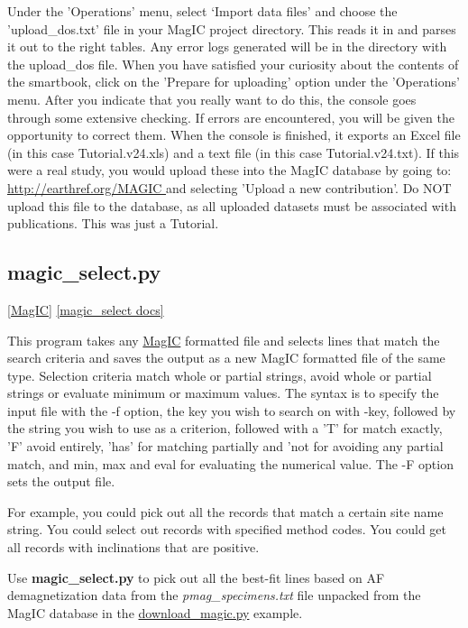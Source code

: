 \documentclass[11pt]{book}
\begin{document}
{{{  Under the 'Operations' menu, select `Import data files' and choose the 'upload\_dos.txt' file in your MagIC project directory.  
 This reads it in and parses it out to the right tables.  Any error logs generated will be in the directory with the upload\_dos file.  When you have satisfied your curiosity about the contents of the smartbook, click on the 'Prepare for uploading' option under the 'Operations' menu.  After you indicate that you really want to do this, the console goes through some extensive checking.   If errors are encountered, you will be given the opportunity to correct them.  When the console  is finished,  it exports an Excel file (in this case Tutorial.v24.xls) and a text file (in this case Tutorial.v24.txt).  If this were a real study, you would upload these into the MagIC database by going to:
\url{  http://earthref.org/MAGIC }
  and selecting 'Upload a new contribution'.  
  Do NOT upload this file to the database, as all uploaded datasets must be associated with publications.  This was just a Tutorial.
  

%


%
\subsection{magic\_select.py}
\href{#MagIC}{[MagIC]}
\href{http://earthref.org/PmagPy/pmagpydocs/magic_select-module.html}{[magic\_select docs]}


This program takes any \href{#MagIC}{MagIC} formatted file and selects lines that match the search criteria and saves the output as a new MagIC formatted file of the same type.  Selection criteria match whole or partial strings, avoid whole or partial strings or evaluate minimum or maximum values.    The syntax is to specify the input file with the -f option, the key you wish to search on with -key, followed by the string you wish to use as a criterion, followed with a 'T' for match exactly, 'F' avoid entirely, 'has' for matching partially and 'not for avoiding any partial match, and min, max and eval for evaluating the numerical value.  The -F option sets the output file.  

  For example, you could pick out all the records that match a certain site name string.  You could select out records with specified method codes.  You could get all records with inclinations that are positive.   
  
  Use {\bf magic\_select.py} to pick out all the best-fit lines based on AF demagnetization data from the {\it pmag\_specimens.txt} file unpacked from the MagIC database in the \href{#download_magic.py}{download\_magic.py} example.
  
}}}
\end{document}
